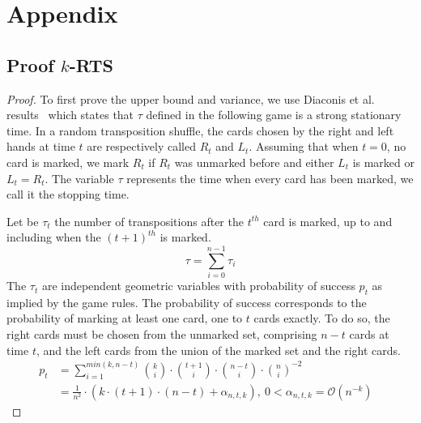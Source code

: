 \documentclass{llncs}
\begin{document}



\section{Appendix}
\subsection{Proof $k$-RTS}
\begin{proof}
To first prove the upper bound and variance, we use Diaconis et al. results~\cite{aldous1986shuffling} which states that $\tau$ defined in the following game is a strong stationary time.
In a random transposition shuffle, the cards chosen by the right and left hands at time $t$ are respectively called $R_t$ and $L_t$. Assuming that when $t=0$, no card is marked, we mark $R_t$ if
$R_t$ was unmarked before and either $L_t$ is marked or $L_t = R_t$. The variable $\tau$ represents the time when every card has been marked, we call it the stopping time.

Let be $\tau_t$ the number of transpositions after the $t^{th}$ card is marked, up to and including when the $(t+1)^{th}$ is marked. $$\tau = \sum_{i=0}^{n-1} \tau_i$$
The $\tau_t$ are independent geometric variables with probability of success $p_t$ as implied by the game rules.
The probability of success corresponds to the probability of marking at least one card, one to $t$ cards exactly. To do so, the right cards must be chosen from the unmarked set, comprising $n-t$ cards at time $t$,
and the left cards from the union of the marked set and the right cards.
\begin{align*}
 p_t &= \sum_{i=1}^{min(k,n-t)} {k \choose i} \cdot {t+1 \choose i} \cdot {n-t \choose i}\cdot{n \choose i}^{-2}&\\
 &= \frac{1}{n^2} \cdot \left ( k \cdot (t+1)\cdot(n-t) + \alpha_{n,t,k}\right ),\ 0 < \alpha_{n,t,k} = \mathcal{O}\left(n^{-k}\right )
\end{align*}


\end{proof}
\end{document}
